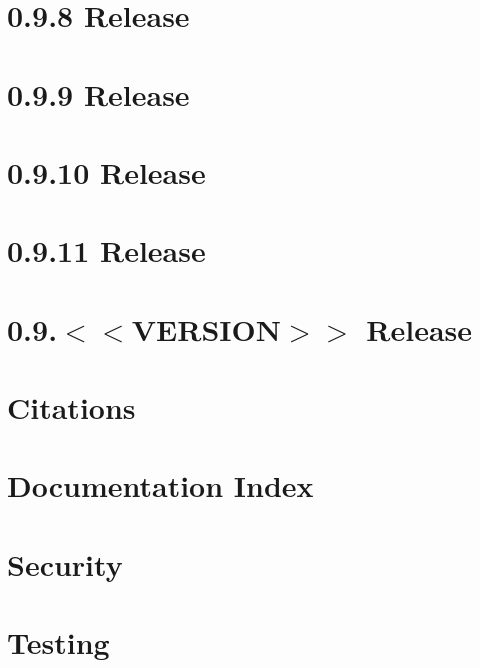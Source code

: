 \let\mypdfximage\pdfximage\def\pdfximage{\immediate\mypdfximage}\documentclass[twoside]{book}
\newcommand{\+}{\discretionary{\mbox{\scriptsize$\hookleftarrow$}}{}{}}
\begin{document}
\chapter{0.9.8 Release}
\label{doc_news_2021-10-04_0_9_8_md}

\chapter{0.9.9 Release}
\label{doc_news_2022-03-10_0_9_9_md}

\chapter{0.9.10 Release}
\label{doc_news_2022-07-11_0_9_10_md}

\chapter{0.9.11 Release}
\label{doc_news_2022-10-05_0_9_11_md}

\chapter{0.9.$<$$<$VERSION$>$$>$ Release}
\label{doc_news__preparation_next_release_md}

\chapter{Citations}
\label{doc_paper_README_md}

\chapter{Documentation Index}
\label{doc_README_md}

\chapter{Security}
\label{doc_SECURITY_md}

\chapter{Testing}
\label{doc_TESTING_md}

\end{document}
